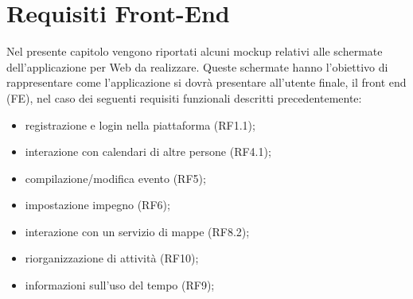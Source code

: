 \section{Requisiti Front-End}
\label{sec:RequisitiFrontEnd}

Nel presente capitolo vengono riportati alcuni mockup relativi alle schermate dell’applicazione per Web da realizzare. Queste schermate hanno l’obiettivo di rappresentare come l’applicazione si dovrà presentare all’utente finale, il front end (FE), nel caso dei seguenti requisiti funzionali descritti precedentemente: 
\begin{itemize}
    \item registrazione e login nella piattaforma (RF1.1);
    \item interazione con calendari di altre persone (RF4.1);
    \item compilazione/modifica evento (RF5);
    \item impostazione impegno (RF6);
    \item interazione con un servizio di mappe (RF8.2);
    \item riorganizzazione di attività (RF10);
    \item informazioni sull’uso del tempo (RF9);
\end{itemize}

